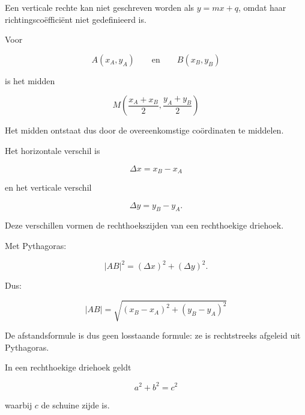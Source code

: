 \documentclass{ximera}
\begin{document}
Een verticale rechte kan niet geschreven worden als \(y=mx+q\), omdat haar
richtingscoëfficiënt niet gedefinieerd is.



Voor

\[
A(x_A,y_A)
\qquad\text{en}\qquad
B(x_B,y_B)
\]

is het midden

\[
\boxed{
M\left(
\frac{x_A+x_B}{2},
\frac{y_A+y_B}{2}
\right)
}
\]

Het midden ontstaat dus door de overeenkomstige coördinaten te middelen.



Het horizontale verschil is

\[
\Delta x=x_B-x_A
\]

en het verticale verschil

\[
\Delta y=y_B-y_A.
\]

Deze verschillen vormen de rechthoekszijden van een rechthoekige driehoek.

Met Pythagoras:

\[
|AB|^2
=
(\Delta x)^2+(\Delta y)^2.
\]

Dus:

\[
\boxed{
|AB|
=
\sqrt{(x_B-x_A)^2+(y_B-y_A)^2}
}
\]

De afstandsformule is dus geen losstaande formule: ze is rechtstreeks afgeleid uit Pythagoras.



In een rechthoekige driehoek geldt

\[
\boxed{
a^2+b^2=c^2
}
\]

waarbij \(c\) de schuine zijde is.


\begin{center}
\end{center}
\end{document}
